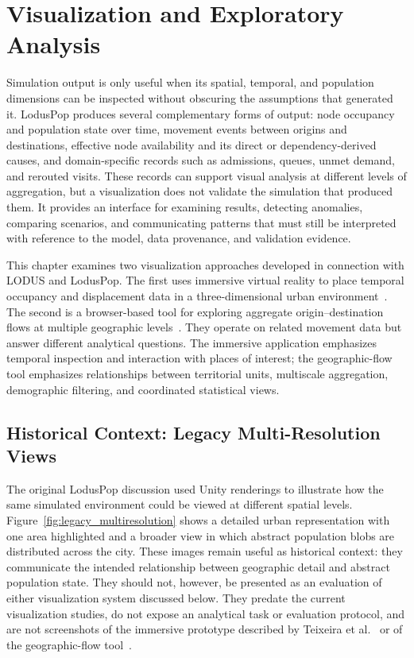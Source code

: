 \chapter{Visualization and Exploratory Analysis}
\label{sec:visualization}

Simulation output is only useful when its spatial, temporal, and population dimensions can be inspected without obscuring the assumptions that generated it. LodusPop produces several complementary forms of output: node occupancy and population state over time, movement events between origins and destinations, effective node availability and its direct or dependency-derived causes, and domain-specific records such as admissions, queues, unmet demand, and rerouted visits. These records can support visual analysis at different levels of aggregation, but a visualization does not validate the simulation that produced them. It provides an interface for examining results, detecting anomalies, comparing scenarios, and communicating patterns that must still be interpreted with reference to the model, data provenance, and validation evidence.

This chapter examines two visualization approaches developed in connection with LODUS and LodusPop. The first uses immersive virtual reality to place temporal occupancy and displacement data in a three-dimensional urban environment~\cite{teixeira2024visualization}. The second is a browser-based tool for exploring aggregate origin--destination flows at multiple geographic levels~\cite{silva2026geospatial}. They operate on related movement data but answer different analytical questions. The immersive application emphasizes temporal inspection and interaction with places of interest; the geographic-flow tool emphasizes relationships between territorial units, multiscale aggregation, demographic filtering, and coordinated statistical views.

\section{Historical Context: Legacy Multi-Resolution Views}
\label{visualization:legacy}

The original LodusPop discussion used Unity renderings to illustrate how the same simulated environment could be viewed at different spatial levels. Figure~\ref{fig:legacy_multiresolution} shows a detailed urban representation with one area highlighted and a broader view in which abstract population blobs are distributed across the city. These images remain useful as historical context: they communicate the intended relationship between geographic detail and abstract population state. They should not, however, be presented as an evaluation of either visualization system discussed below. They predate the current visualization studies, do not expose an analytical task or evaluation protocol, and are not screenshots of the immersive prototype described by Teixeira et al.~\cite{teixeira2024visualization} or of the geographic-flow tool~\cite{silva2026geospatial}.


